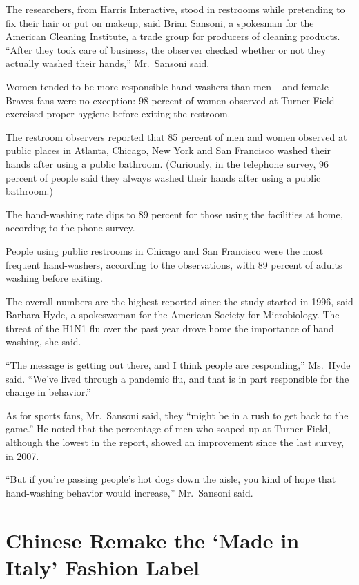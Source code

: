 ﻿\documentclass[12pt]{article}
\begin{document}
The researchers, from Harris Interactive, stood in restrooms while pretending to fix their hair or
put on makeup, said Brian Sansoni, a spokesman for the American Cleaning Institute, a trade group
for producers of cleaning products. ``After they took care of business, the observer checked whether
or not they actually washed their hands,'' Mr.~Sansoni said.

Women tended to be more responsible hand-washers than men -- and female Braves fans were no
exception: 98 percent of women observed at Turner Field exercised proper hygiene before exiting the
restroom.

The restroom observers reported that 85 percent of men and women observed at public places in
Atlanta, Chicago, New York and San Francisco washed their hands after using a public bathroom.
(Curiously, in the telephone survey, 96 percent of people said they always washed their hands after
using a public bathroom.)

The hand-washing rate dips to 89 percent for those using the facilities at home, according to the
phone survey.

People using public restrooms in Chicago and San Francisco were the most frequent hand-washers,
according to the observations, with 89 percent of adults washing before exiting.

The overall numbers are the highest reported since the study started in 1996, said Barbara Hyde, a
spokeswoman for the American Society for Microbiology. The threat of the H1N1 flu over the past year
drove home the importance of hand washing, she said.

``The message is getting out there, and I think people are responding,'' Ms.~Hyde said. ``We've
lived through a pandemic flu, and that is in part responsible for the change in behavior.''

As for sports fans, Mr.~Sansoni said, they ``might be in a rush to get back to the game.'' He noted
that the percentage of men who soaped up at Turner Field, although the lowest in the report, showed
an improvement since the last survey, in 2007.

``But if you're passing people's hot dogs down the aisle, you kind of hope that hand-washing
behavior would increase,'' Mr.~Sansoni said.

\pagebreak
\section{Chinese Remake the `Made in Italy' Fashion Label}
\end{document}
